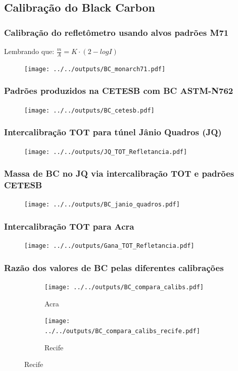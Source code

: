 \subsection{Calibração do Black Carbon}
\begin{frame}
  \frametitle{Calibração do refletômetro usando alvos padrões M71}
	Lembrando que: $ \frac{m}{A} = K \cdot (2-logI) $
  \begin{figure}[H]
    \centering
    \texttt{[image: ../../outputs/BC\_monarch71.pdf]}
  \end{figure}
\end{frame}

\begin{frame}
  \frametitle{Padrões produzidos na CETESB com BC ASTM-N762}
  \begin{figure}[H]
  	\centering
  	\texttt{[image: ../../outputs/BC\_cetesb.pdf]}
  \end{figure}
\end{frame}

\begin{frame}
  \frametitle{Intercalibração TOT para túnel Jânio Quadros (JQ)}
  \begin{figure}[H]
    \centering
    \texttt{[image: ../../outputs/JQ\_TOT\_Refletancia.pdf]}
  \end{figure}
\end{frame}

\begin{frame}
  \frametitle{Massa de BC no JQ via intercalibração TOT e padrões CETESB}
  \begin{figure}[H]
    \centering
      \texttt{[image: ../../outputs/BC\_janio\_quadros.pdf]}
  \end{figure}
\end{frame}

\begin{frame}
  \frametitle{Intercalibração TOT para Acra}
  \begin{figure}[H]
  	\begin{center}
  		\texttt{[image: ../../outputs/Gana\_TOT\_Refletancia.pdf]}
  	\end{center}
  \end{figure}
\end{frame}

\begin{frame}
  \frametitle{Razão dos valores de BC pelas diferentes calibrações}
  \begin{figure}[H]
  	\centering
  	\begin{subfigure}[b]{0.44\linewidth}
  		\texttt{[image: ../../outputs/BC\_compara\_calibs.pdf]}
  		\caption{Acra}
  	\end{subfigure}
  		\hspace{0.3cm}
  	\begin{subfigure}[b]{0.44\linewidth}
  		\texttt{[image: ../../outputs/BC\_compara\_calibs\_recife.pdf]}
  		\caption{Recife}
  	\end{subfigure}%
   \end{figure}
\end{frame}

